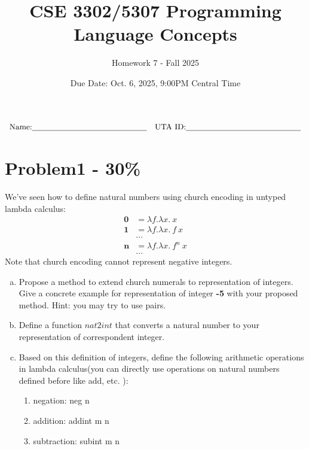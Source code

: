 \documentclass{article}
\newcommand{\answerboxbig}{
    \vspace{20cm} %
}
\newcommand{\studentinfo}{
    $$\begin{array}{cc}
        \noindent \text{Name:} \underline{\hspace{5cm}} &
            \text{UTA ID:} \underline{\hspace{5cm}}\\
    \end{array}$$
}
\begin{document}
\title{CSE 3302/5307 Programming Language Concepts}
\author{Homework 7 - Fall 2025}
\date{Due Date: Oct. 6, 2025, 9:00PM Central Time}
\maketitle
\thispagestyle{fancy}

\studentinfo


\section*{Problem1 - 30\%}

	We've seen how to define natural numbers using church encoding in untyped lambda calculus:
	\begin{align*}
		\mathbf{0} &= \lambda f.\lambda x.\ x \\
		\mathbf{1} &= \lambda f.\lambda x.\ f\ x \\
		&\dots \\
		\mathbf{n} &= \lambda f.\lambda x.\ f^n\ x \\
		&\dots
	\end{align*}
	Note that church encoding cannot represent negative integers.
	
	\begin{enumerate}[(a)]
		\item Propose a method to extend church numerals to representation of integers. Give a concrete example for representation of integer \textbf{-5} with your proposed method. Hint: you may try to use pairs.
		
		\item Define a function $nat2int$ that converts a natural number to your representation of correspondent integer.
		
		\item Based on this definition of integers, define the following arithmetic operations in lambda calculus(you can directly use operations on natural numbers defined before like add, etc. ): 
		\begin{enumerate}[(1)]
			\item negation: neg n
			\item addition: addint m n
			\item subtraction: subint m n
		\end{enumerate}
	\end{enumerate}
\answerboxbig


\newpage
\end{document}
